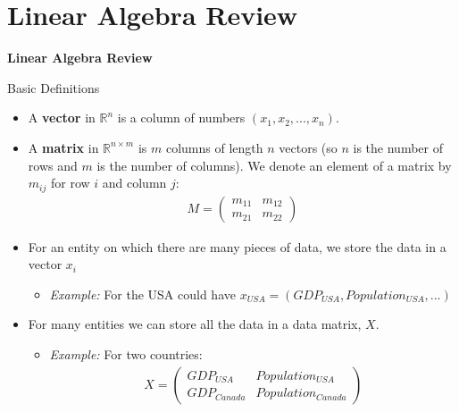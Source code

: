 \section{Linear Algebra Review}

\begin{frame}

\begin{center}
	{\Large \bf Linear Algebra Review}	
\end{center}

\end{frame}


\begin{frame}{Basic Definitions}
\begin{itemize}
	\item A {\bf vector} in $\mathbb{R}^n$ is a column of numbers $(x_1,x_2,...,x_n)$.
	\item A {\bf matrix} in $\mathbb{R}^{n\times m}$ is $m$ columns of length $n$ vectors (so $n$ is the number of rows and $m$ is the number of columns). We denote an element of a matrix by $m_{ij}$ for row $i$ and column $j$:
	\begin{align*}
		M = \left(\begin{array}{cc}
			m_{11} & m_{12}\\
			m_{21} & m_{22}
		\end{array}\right)
	\end{align*}
	\item For an entity on which there are many pieces of data, we store the data in a vector $x_i$
	\begin{itemize}
		\item[]\emph{Example:} For the USA could have $x_{USA} = \left(GDP_{USA}, Population_{USA},...\right)$
	\end{itemize}
	\item For many entities we can store all the data in a data matrix, $X$.
	\begin{itemize}
		\item[]\emph{Example:} For two countries:
			\begin{align*}
		X = \left(\begin{array}{ll}
			GDP_{USA} & Population_{USA}\\
			GDP_{Canada} & Population_{Canada}
		\end{array}\right)
			\end{align*}
	\end{itemize}
\end{itemize}

\end{frame}


